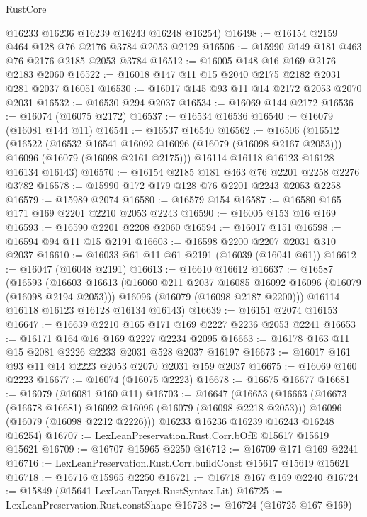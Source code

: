 \begin{lexlean}{RustCore}
\begin{coremodule}
      @16233
      @16236
      @16239
      @16243
      @16248
      @16254)
@16498 := @16154 @2159 @464 @128 @76 @2176 @3784 @2053 @2129
@16506 := @15990 @149 @181 @463 @76 @2176 @2185 @2053 @3784
@16512 := @16005 @148 @16 @169 @2176 @2183 @2060
@16522 := @16018 @147 @11 @15 @2040 @2175 @2182 @2031 @281 @2037 @16051
@16530 := @16017 @145 @93 @11 @14 @2172 @2053 @2070 @2031
@16532 := @16530 @294 @2037
@16534 := @16069 @144 @2172
@16536 := @16074 (@16075 @2172)
@16537 := @16534 @16536
@16540 := @16079 (@16081 @144 @11)
@16541 := @16537 @16540
@16562 := @16506
    (@16512
      (@16522
        (@16532 @16541 @16092 @16096 (@16079 (@16098 @2167 @2053)))
        @16096
        (@16079 (@16098 @2161 @2175)))
      @16114
      @16118
      @16123
      @16128
      @16134
      @16143)
@16570 := @16154 @2185 @181 @463 @76 @2201 @2258 @2276 @3782
@16578 := @15990 @172 @179 @128 @76 @2201 @2243 @2053 @2258
@16579 := @15989 @2074
@16580 := @16579 @154
@16587 := @16580 @165 @171 @169 @2201 @2210 @2053 @2243
@16590 := @16005 @153 @16 @169
@16593 := @16590 @2201 @2208 @2060
@16594 := @16017 @151
@16598 := @16594 @94 @11 @15 @2191
@16603 := @16598 @2200 @2207 @2031 @310 @2037
@16610 := @16033 @61 @11 @61 @2191 (@16039 (@16041 @61))
@16612 := @16047 (@16048 @2191)
@16613 := @16610 @16612
@16637 := @16587
    (@16593
      (@16603
        @16613
        (@16060 @211 @2037 @16085 @16092 @16096 (@16079 (@16098 @2194 @2053)))
        @16096
        (@16079 (@16098 @2187 @2200)))
      @16114
      @16118
      @16123
      @16128
      @16134
      @16143)
@16639 := @16151 @2074 @16153
@16647 := @16639 @2210 @165 @171 @169 @2227 @2236 @2053 @2241
@16653 := @16171 @164 @16 @169 @2227 @2234 @2095
@16663 := @16178 @163 @11 @15 @2081 @2226 @2233 @2031 @528 @2037 @16197
@16673 := @16017 @161 @93 @11 @14 @2223 @2053 @2070 @2031 @159 @2037
@16675 := @16069 @160 @2223
@16677 := @16074 (@16075 @2223)
@16678 := @16675 @16677
@16681 := @16079 (@16081 @160 @11)
@16703 := @16647
    (@16653
      (@16663
        (@16673 (@16678 @16681) @16092 @16096 (@16079 (@16098 @2218 @2053)))
        @16096
        (@16079 (@16098 @2212 @2226)))
      @16233
      @16236
      @16239
      @16243
      @16248
      @16254)
@16707 := LexLeanPreservation.Rust.Corr.bOfE @15617 @15619 @15621
@16709 := @16707 @15965 @2250
@16712 := @16709 @171 @169 @2241
@16716 := LexLeanPreservation.Rust.Corr.buildConst @15617 @15619 @15621
@16718 := @16716 @15965 @2250
@16721 := @16718 @167 @169 @2240
@16724 := @15849 (@15641 LexLeanTarget.RustSyntax.Lit)
@16725 := LexLeanPreservation.Rust.constShape
@16728 := @16724 (@16725 @167 @169)

\end{coremodule}
\end{lexlean}

